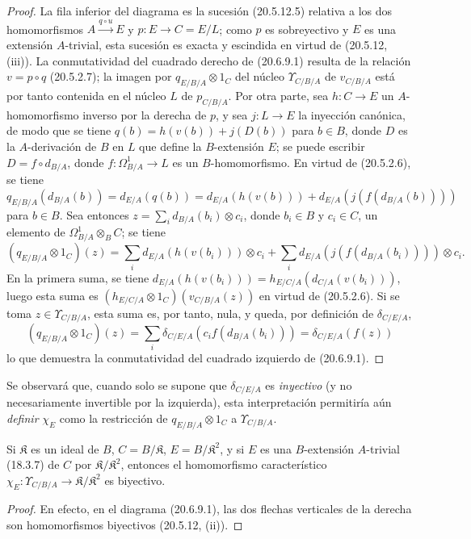 \begin{proof}
La fila inferior del diagrama es la sucesión (20.5.12.5) relativa a los
dos homomorfismos $A\xrightarrow{q\circ u}E$ y
$p:E\to C=E/L$; como $p$ es sobreyectivo y $E$ es una extensión
$A$-trivial, esta sucesión es exacta y escindida en virtud de (20.5.12,
(iii)). La conmutatividad del cuadrado derecho de (20.6.9.1) resulta de la
relación $v=p\circ q$ (20.5.2.7); la imagen por
$q_{E/B/A}\otimes1_C$ del núcleo $\Upsilon_{C/B/A}$ de $v_{C/B/A}$ está
por tanto contenida en el núcleo $L$ de $p_{C/B/A}$. Por otra parte, sea
$h:C\to E$ un $A$-homomorfismo inverso por la derecha de $p$, y sea
$j:L\to E$ la inyección canónica, de modo que se tiene
$q(b)=h(v(b))+j(D(b))$ para $b\in B$, donde $D$ es la $A$-derivación de
$B$ en $L$ que define la $B$-extensión $E$; se puede escribir
$D=f\circ d_{B/A}$, donde $f:\Omega^1_{B/A}\to L$ es un
$B$-homomorfismo. En virtud de (20.5.2.6), se tiene
$q_{E/B/A}(d_{B/A}(b))=d_{E/A}(q(b))=d_{E/A}(h(v(b)))+d_{E/A}(j(f(d_{B/A}(b))))$
para $b\in B$. Sea entonces
$z=\sum_i d_{B/A}(b_i)\otimes c_i$, donde $b_i\in B$ y $c_i\in C$, un
elemento de $\Omega^1_{B/A}\otimes_B C$; se tiene
\[
  (q_{E/B/A}\otimes1_C)(z)=
  \sum_i d_{E/A}(h(v(b_i)))\otimes c_i+
  \sum_i d_{E/A}(j(f(d_{B/A}(b_i))))\otimes c_i.
\]
En la primera suma, se tiene
$d_{E/A}(h(v(b_i)))=h_{E/C/A}(d_{C/A}(v(b_i)))$, luego esta suma es
$(h_{E/C/A}\otimes1_C)(v_{C/B/A}(z))$ en virtud de (20.5.2.6). Si se
toma $z\in\Upsilon_{C/B/A}$, esta suma es, por tanto, nula, y queda,
por definición de $\delta_{C/E/A}$,
\[
  (q_{E/B/A}\otimes1_C)(z)=
  \sum_i\delta_{C/E/A}(c_i f(d_{B/A}(b_i)))
  =\delta_{C/E/A}(f(z))
\]
lo que demuestra la conmutatividad del cuadrado izquierdo de (20.6.9.1).
\end{proof}

Se observará que, cuando solo se supone que $\delta_{C/E/A}$ es
\emph{inyectivo} (y no necesariamente invertible por la izquierda), esta
interpretación permitiría aún \emph{definir} $\chi_E$ como la
restricción de $q_{E/B/A}\otimes1_C$ a $\Upsilon_{C/B/A}$.

\begin{corollary}[20.6.10]
\label{0.20.6.10-fr}
Si $\mathfrak{K}$ es un ideal de $B$, $C=B/\mathfrak{K}$,
$E=B/\mathfrak{K}^2$, y si $E$ es una $B$-extensión $A$-trivial
\textup{(18.3.7)} de $C$ por $\mathfrak{K}/\mathfrak{K}^2$, entonces
el homomorfismo característico
$\chi_E:\Upsilon_{C/B/A}\to\mathfrak{K}/\mathfrak{K}^2$ es biyectivo.
\end{corollary}
\begin{proof}
En efecto, en el diagrama (20.6.9.1), las dos flechas verticales de la
derecha son homomorfismos biyectivos (20.5.12, (ii)).
\end{proof}

